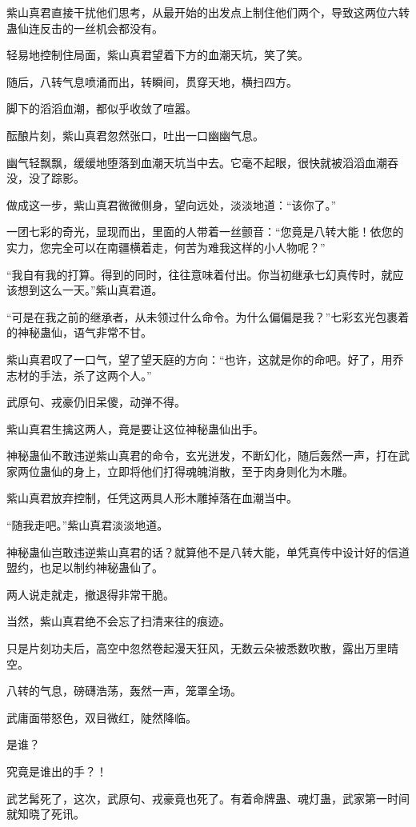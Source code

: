 \begin{this_body}
紫山真君直接干扰他们思考，从最开始的出发点上制住他们两个，导致这两位六转蛊仙连反击的一丝机会都没有。

轻易地控制住局面，紫山真君望着下方的血潮天坑，笑了笑。

随后，八转气息喷涌而出，转瞬间，贯穿天地，横扫四方。

脚下的滔滔血潮，都似乎收敛了喧嚣。

酝酿片刻，紫山真君忽然张口，吐出一口幽幽气息。

幽气轻飘飘，缓缓地堕落到血潮天坑当中去。它毫不起眼，很快就被滔滔血潮吞没，没了踪影。

做成这一步，紫山真君微微侧身，望向远处，淡淡地道：“该你了。”

一团七彩的奇光，显现而出，里面的人带着一丝颤音：“您竟是八转大能！依您的实力，您完全可以在南疆横着走，何苦为难我这样的小人物呢？”

“我自有我的打算。得到的同时，往往意味着付出。你当初继承七幻真传时，就应该想到这么一天。”紫山真君道。

“可是在我之前的继承者，从未领过什么命令。为什么偏偏是我？”七彩玄光包裹着的神秘蛊仙，语气非常不甘。

紫山真君叹了一口气，望了望天庭的方向：“也许，这就是你的命吧。好了，用乔志材的手法，杀了这两个人。”

武原句、戎豪仍旧呆傻，动弹不得。

紫山真君生擒这两人，竟是要让这位神秘蛊仙出手。

神秘蛊仙不敢违逆紫山真君的命令，玄光迸发，不断幻化，随后轰然一声，打在武家两位蛊仙的身上，立即将他们打得魂魄消散，至于肉身则化为木雕。

紫山真君放弃控制，任凭这两具人形木雕掉落在血潮当中。

“随我走吧。”紫山真君淡淡地道。

神秘蛊仙岂敢违逆紫山真君的话？就算他不是八转大能，单凭真传中设计好的信道盟约，也足以制约神秘蛊仙了。

两人说走就走，撤退得非常干脆。

当然，紫山真君绝不会忘了扫清来往的痕迹。

只是片刻功夫后，高空中忽然卷起漫天狂风，无数云朵被悉数吹散，露出万里晴空。

八转的气息，磅礴浩荡，轰然一声，笼罩全场。

武庸面带怒色，双目微红，陡然降临。

是谁？

究竟是谁出的手？！

武艺髯死了，这次，武原句、戎豪竟也死了。有着命牌蛊、魂灯蛊，武家第一时间就知晓了死讯。


\end{this_body}
